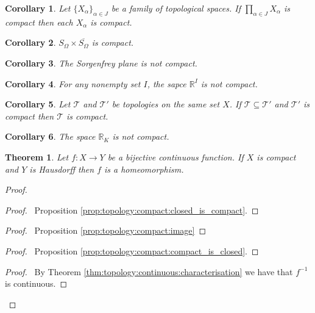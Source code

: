 \documentclass{report}
\let\qed\relax
\newtheorem{thm}[lm]{Theorem}
\newtheorem{cor}{Corollary}[lm]
\theoremstyle{definition}
\begin{document}
  \begin{cor}
    Let $\{ X_\alpha \}_{\alpha \in J}$ be a family of topological spaces. If
    $\prod_{\alpha \in J} X_\alpha$ is compact then each $X_\alpha$ is compact.
  \end{cor}

  \begin{cor}
    $S_\Omega \times \overline{S_\Omega}$ is compact.
  \end{cor}

  \begin{cor}
   The Sorgenfrey plane is not compact.
  \end{cor}

  \begin{cor}
  	For any nonempty set $I$,
    the sapce $\mathbb{R}^I$ is not compact.
  \end{cor}

	\begin{cor}
		Let $\mathcal{T}$ and $\mathcal{T}'$ be topologies on the same
set $X$. If $\mathcal{T} \subseteq \mathcal{T}'$ and
$\mathcal{T}'$ is compact then $\mathcal{T}$ is compact.
	\end{cor}

        \begin{cor}
          The space $\mathbb{R}_K$ is not compact.
        \end{cor}

  \begin{thm}
    \label{thm:topology:compact:homeomorphism}
    Let $f : X \rightarrow Y$ be a bijective continuous function. If $X$ is
    compact and $Y$ is Hausdorff then $f$ is a homeomorphism.
  \end{thm}

  \begin{proof}
    \pf
    \begin{proof}
      \pf\ Proposition \ref{prop:topology:compact:closed_is_compact}.
    \end{proof}
    \begin{proof}
      \pf\ Proposition \ref{prop:topology:compact:image}
    \end{proof}
    \begin{proof}
      \pf\ Proposition \ref{prop:topology:compact:compact_is_closed}.
    \end{proof}
    \qedstep
    \begin{proof}
      \pf\ By Theorem
      \ref{thm:topology:continuous:characterisation}
      we have that      $f^{-1}$ is continuous.
    \end{proof}
    \qed
  \end{proof}
\end{document}
